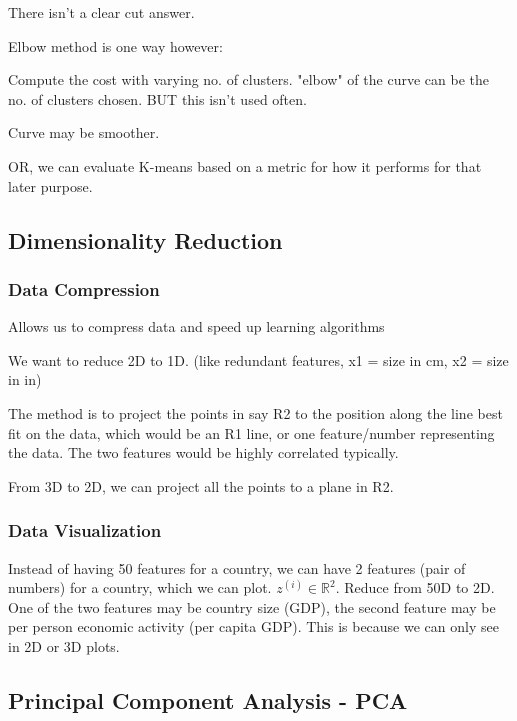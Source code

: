 \documentclass{article}
\begin{document}
There isn't a clear cut answer.


Elbow method is one way however:

Compute the cost with varying no. of clusters. "elbow" of the curve can be the no. of clusters chosen. BUT this isn't used often.

Curve may be smoother.

\hspace{
}

OR, we can evaluate K-means based on a metric for how it performs for that later purpose.



\subsection{Dimensionality Reduction}

\subsubsection{Data Compression}
Allows us to compress data and speed up learning algorithms

We want to reduce 2D to 1D. (like redundant features, x1 = size in cm, x2 = size in in)

The method is to project the points in say R2 to the position along the line best fit on the data, which would be an R1 line, or one feature/number representing the data. The two features would be highly correlated typically.


From 3D to 2D, we can project all the points to a plane in R2.



\subsubsection{Data Visualization}

Instead of having 50 features for a country, we can have 2 features (pair of numbers) for a country, which we can plot. $z^{(i)} \in \mathbb{R}^2$. Reduce from 50D to 2D. One of the two features may be country size (GDP), the second feature may be per person economic activity (per capita GDP). This is because we can only see in 2D or 3D plots.




\subsection{Principal Component Analysis - PCA}
\end{document}
